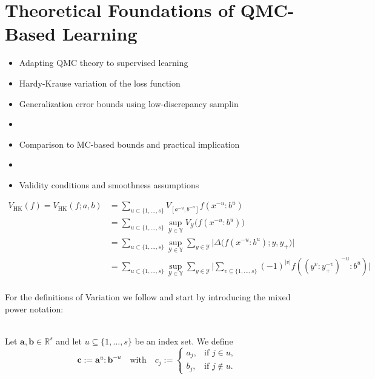 \chapter{Theoretical Foundations of QMC-Based Learning}
\label{chapter5}

\begin{itemize}
    \item Adapting QMC theory to supervised learning
    \item Hardy-Krause variation of the loss function
    \item Generalization error bounds using low-discrepancy samplin\item 
    \item Comparison to MC-based bounds and practical implication\item 
    \item Validity conditions and smoothness assumptions
\end{itemize}

\begin{align*}
    V_{\mathrm{HK}}(f) = V_{\mathrm{HK}}(f; a, b) &= \sum_{u\subset \{1,\dots,s\}} V_{[a^{-u}, b^{-u}]} f(x^{-u}:b^u) \\
    &= \sum_{u\subset \{1,\dots,s\}} \sup_{\mathcal{Y} \in \mathbb{Y}} V_\mathcal{Y} \big( f(x^{-u} : b^u) \big) \\
    &= \sum_{u\subset \{1,\dots,s\}} \sup_{\mathcal{Y} \in \mathbb{Y}} \sum_{y\in\mathcal{Y}} \big| \Delta\big( f(x^{-u} : b^u); y, y_+ \big) \big| \\
    &= \sum_{u\subset \{1,\dots,s\}} \sup_{\mathcal{Y} \in \mathbb{Y}} \sum_{y\in\mathcal{Y}} \big| \sum_{v\subseteq \{1,\dots,s\}} (-1)^{|v|} f((y^v:y_+^{-v})^{-u}:b^{u}) \big| \\
\end{align*}

For the definitions of Variation we follow \cite{owen2005multidimensional} and
start by introducing the mixed power notation:

\begin{definition} \ \\
    \label{def:component_merge}
    Let $\boldsymbol{a}, \boldsymbol{b} \in \mathbb{R}^s$ and let $u \subseteq \{1, \dots, s\}$ be an index set. We define
    \begin{equation*}
        \boldsymbol{c} := \boldsymbol{a}^u : \boldsymbol{b}^{-u}
        \quad \text{with} \quad
        c_j := 
        \begin{cases}
            a_j, & \text{if } j \in u, \\
            b_j, & \text{if } j \notin u.
        \end{cases}
    \end{equation*}
\end{definition}

